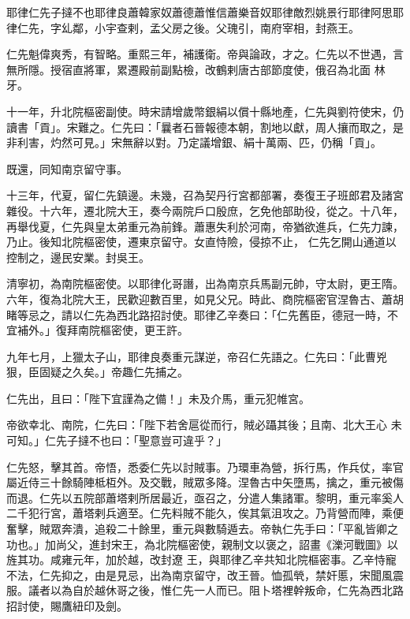 
\begin{pinyinscope}

 耶律仁先子撻不也耶律良蕭韓家奴蕭德蕭惟信蕭樂音奴耶律敵烈姚景行耶律阿思耶律仁先，字乣鄰，小宇查剌，孟父房之後。父瑰引，南府宰相，封燕王。



 仁先魁偉爽秀，有智略。重熙三年，補護衛。帝與論政，才之。仁先以不世遇，言無所隱。授宿直將軍，累遷殿前副點檢，改鶴剌唐古部節度使，俄召為北面
 林牙。



 十一年，升北院樞密副使。時宋請增歲幣銀絹以償十縣地產，仁先與劉符使宋，仍讀書「貢」。宋難之。仁先曰：「曩者石晉報德本朝，割地以獻，周人攘而取之，是非利害，灼然可見。」宋無辭以對。乃定議增銀、絹十萬兩、匹，仍稱「貢」。



 既還，同知南京留守事。



 十三年，代夏，留仁先鎮邊。未幾，召為契丹行宮都部署，奏復王子班郎君及諸宮雜役。十六年，遷北院大王，奏今兩院戶口殷庶，乞免他部助役，從之。十八年，再舉伐夏，仁先與皇太弟重元為前鋒。蕭惠失利於河南，帝猶欲進兵，仁先力諫，乃止。後知北院樞密使，遷東京留守。女直恃險，侵掠不止，
 仁先乞開山通道以控制之，邊民安業。封吳王。



 清寧初，為南院樞密使。以耶律化哥譖，出為南京兵馬副元帥，守太尉，更王隋。六年，復為北院大王，民歡迎數百里，如見父兄。時此、商院樞密官涅魯古、蕭胡睹等忌之，請以仁先為西北路招討使。耶律乙辛奏曰：「仁先舊臣，德冠一時，不宜補外。」復拜南院樞密使，更王許。



 九年七月，上獵太子山，耶律良奏重元謀逆，帝召仁先語之。仁先曰：「此曹兇狠，臣固疑之久矣。」帝趣仁先捕之。



 仁先出，且曰：「陛下宜謹為之備！」未及介馬，重元犯帷宮。



 帝欲幸北、南院，仁先曰：「陛下若舍扈從而行，賊必躡其後；且南、北大王心
 未可知。」仁先子撻不也曰：「聖意豈可違乎？」



 仁先怒，擊其首。帝悟，悉委仁先以討賊事。乃環車為營，拆行馬，作兵仗，率官屬近侍三十餘騎陣柢枑外。及交戰，賊眾多降。涅魯古中矢墮馬，擒之，重元被傷而退。仁先以五院部蕭塔剌所居最近，亟召之，分遣人集諸軍。黎明，重元率奚人二千犯行宮，蕭塔剌兵適至。仁先料賊不能久，俟其氣沮攻之。乃背營而陣，乘便奮擊，賊眾奔潰，追殺二十餘里，重元與數騎遁去。帝執仁先手曰：「平亂皆卿之功也。」加尚父，進封宋王，為北院樞密使，親制文以褒之，詔畫《濼河戰圖》以旌其功。咸雍元年，加於越，改封遼
 王，與耶律乙辛共知北院樞密事。乙辛恃寵不法，仁先抑之，由是見忌，出為南京留守，改王晉。恤孤煢，禁奸慝，宋聞風震服。議者以為自於越休哥之後，惟仁先一人而已。阻卜塔裡幹叛命，仁先為西北路招討使，賜鷹紐印及劍。




\end{pinyinscope}
